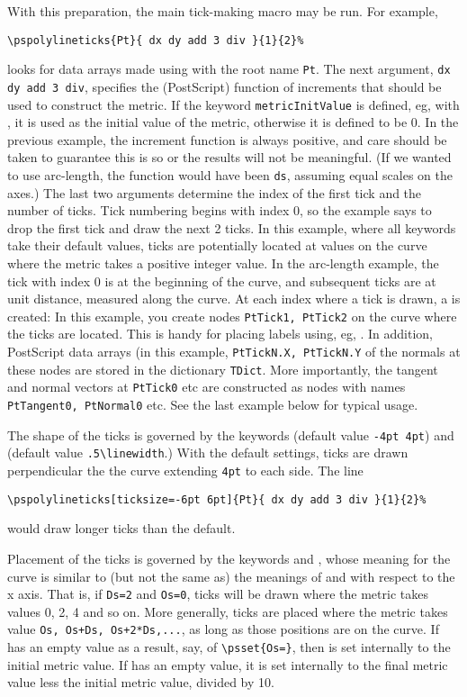 \documentclass[11pt,english,BCOR10mm,DIV12,bibliography=totoc,parskip=false,smallheadings
    headexclude,footexclude,oneside]{pst-doc}
\begin{document}
With this preparation, the main tick-making macro may be run. For example,
\begin{verbatim}
\pspolylineticks{Pt}{ dx dy add 3 div }{1}{2}%
\end{verbatim}
looks for data arrays made using  with the root name {\tt Pt}. The next argument, 
{\tt dx dy add 3 div}, specifies the (PostScript) function of increments that should be used to 
construct the metric. If the keyword \verb|metricInitValue| is defined, eg, with 
, it is used as the initial value of the metric, 
otherwise it is defined to be 0. In the previous example, the increment function is always 
positive, and care should be taken to guarantee this is so or the results will not be meaningful. 
(If we wanted to use arc-length, the function would have been {\tt ds}, assuming equal scales on 
the axes.) The last two arguments determine the index of the first tick and the number of ticks. 
Tick numbering begins with index 0, so the example says to drop the first tick and draw the 
next 2 ticks. In this example, where all keywords take their default values, ticks are 
potentially located at values on the curve where the metric takes a positive integer value. 
In the arc-length example, the tick with index 0 is at the beginning of the curve, and subsequent 
ticks are at unit distance, measured along the curve. At each index where a tick is drawn, a 
 is created: In this example, you create nodes {\tt PtTick1, PtTick2} on the curve 
where the ticks are located. This is handy for placing labels using, eg, . In 
addition, PostScript data arrays (in this example, {\tt PtTickN.X, PtTickN.Y} of the normals 
at these nodes are stored in the dictionary {\tt TDict}. More importantly, the tangent and 
normal vectors at {\tt PtTick0} etc are constructed as nodes with names {\tt PtTangent0, PtNormal0} 
etc. See the last example below for typical usage.

The shape of the ticks is governed by the keywords  (default value {\tt -4pt 4pt})
 and  (default value \verb|.5\linewidth|.) With the default settings, ticks 
 are drawn perpendicular the the curve extending {\tt 4pt} to each side. The line
\begin{verbatim}
\pspolylineticks[ticksize=-6pt 6pt]{Pt}{ dx dy add 3 div }{1}{2}%
\end{verbatim}
would draw longer ticks than the default.

Placement of the ticks is governed by the keywords  and , whose meaning for the 
curve is similar to (but not the same as) the meanings of  and  with respect to the x axis. 
That is, if {\tt Ds=2} and {\tt Os=0}, ticks will be drawn where the metric takes 
values 0, 2, 4 and so on. More generally, ticks are placed where the metric takes 
value {\tt Os, Os+Ds, Os+2*Ds,...}, as long as those positions are on the curve. If  
has an empty value as a result, say, of \verb|\psset{Os=}|, then  is set internally 
to the initial metric value. If  has an empty value, it is set internally to the 
final metric value less the initial metric value, divided by 10. 
\end{document}
